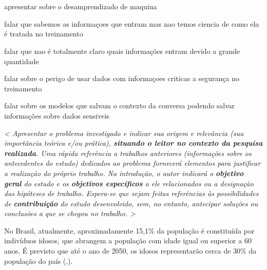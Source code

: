 \chapter*{}
\noindent
{}



\vspace{1.4cm}

apresentar sobre o desamprendizado de maquina

falar que sabemos as informaçoes que entram mas nao temos ciencia de como ela é tratada no treinamento

falar que nao é totalmente claro quais informações entram devido a grande quantidade

falar sobre o perigo de usar dados com informaçoes criticas a segurança no treinamento

falar sobre os modelos que salvam o contexto da conversa podendo salvar informações sobre dados sensiveis


\vspace{0.5cm}

\textit{< Apresentar
o problema investigado e indicar sua origem e relevância (sua importância teórica e/ou prática),\textbf{ situando o leitor no contexto da pesquisa realizada}.
Uma rápida referência a trabalhos anteriores (informações sobre os antecedentes do estudo) dedicados ao problema fornecerá elementos para justificar a realização do próprio trabalho. Na introdução, o autor indicará o \textbf{objetivo geral }do estudo e os \textbf{objetivos específicos} a ele relacionados ou a designação das hipóteses de trabalho.
Espera-se que sejam feitas referências às possibilidades de \textbf{contribuição} do estudo desenvolvido, sem, no entanto, antecipar soluções ou conclusões a que se chegou no trabalho.
>
}
\vspace{0.5cm}
\par No Brasil, atualmente, aproximadamente 15,1\% da população é constituída por indivíduos idosos, que abrangem a população com idade igual ou superior a 60 anos. É previsto que até o ano de 2050, os idosos representarão cerca de 30\% da população do país (,\citeyear{IdososBrasil}). 

